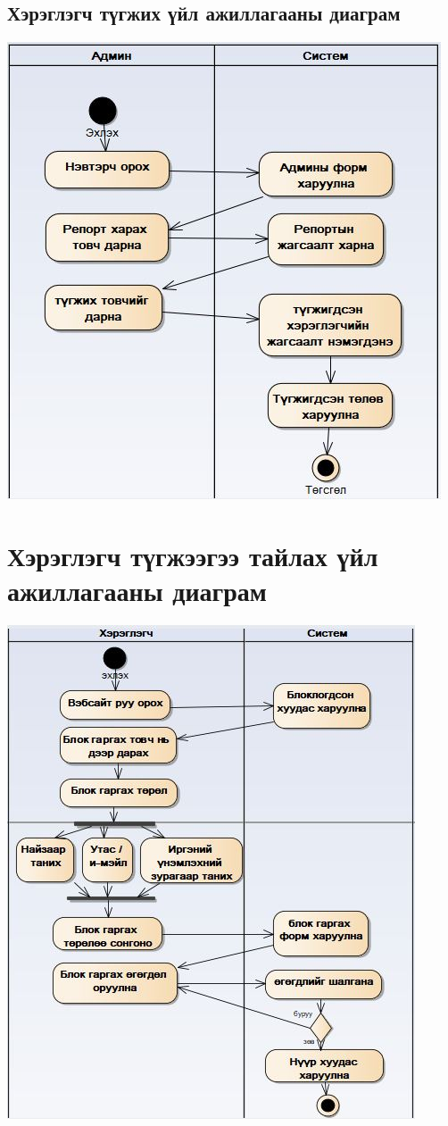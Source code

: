 \documentclass[
oneside, %
english, %
onehalfspacing, %
nolistspacing, %
headsepline, %
]{article} %
\begin{document}
     	\subsection{Хэрэглэгч түгжих үйл ажиллагааны диаграм}
     \includegraphics[width=\textwidth]{tugjihActivity}
     \section{Хэрэглэгч түгжээгээ тайлах үйл ажиллагааны диаграм}
     \includegraphics[width=\textwidth]{unblockActivity}
     
\end{document}
